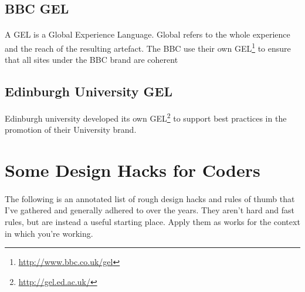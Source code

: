 \subsection{BBC GEL}
\paragraph{} A GEL is a Global Experience Language. Global refers to the whole experience and the reach of the resulting artefact. The BBC use their own GEL\footnote{\url{http://www.bbc.co.uk/gel}} to ensure that all sites under the BBC brand are coherent

\subsection{Edinburgh University GEL}
Edinburgh university developed its own GEL\footnote{\url{http://gel.ed.ac.uk/}} to support best practices in the promotion of their University brand.


\section{Some Design Hacks for Coders}
\paragraph{} The following is an annotated list of rough design hacks and rules of thumb that I've gathered and generally adhered to over the years. They aren't hard and fast rules, but are instead a useful starting place. Apply them as works for the context in which you're working.

